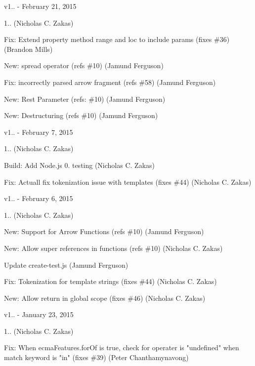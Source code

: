 v1.. -\/ February 21, 2015


\begin{DoxyItemize}
\item 1.. (Nicholas C. Zakas)
\item Fix\+: Extend property method range and loc to include params (fixes \#36) (Brandon Mills)
\item New\+: spread operator (refs \#10) (Jamund Ferguson)
\item Fix\+: incorrectly parsed arrow fragment (refs \#58) (Jamund Ferguson)
\item New\+: Rest Parameter (refs\+: \#10) (Jamund Ferguson)
\item New\+: Destructuring (refs \#10) (Jamund Ferguson)
\end{DoxyItemize}

v1.. -\/ February 7, 2015


\begin{DoxyItemize}
\item 1.. (Nicholas C. Zakas)
\item Build\+: Add Node.\+js 0. testing (Nicholas C. Zakas)
\item Fix\+: Actuall fix tokenization issue with templates (fixes \#44) (Nicholas C. Zakas)
\end{DoxyItemize}

v1.. -\/ February 6, 2015


\begin{DoxyItemize}
\item 1.. (Nicholas C. Zakas)
\item New\+: Support for Arrow Functions (refs \#10) (Jamund Ferguson)
\item New\+: Allow super references in functions (refs \#10) (Nicholas C. Zakas)
\item Update create-\/test.\+js (Jamund Ferguson)
\item Fix\+: Tokenization for template strings (fixes \#44) (Nicholas C. Zakas)
\item New\+: Allow return in global scope (fixes \#46) (Nicholas C. Zakas)
\end{DoxyItemize}

v1.. -\/ January 23, 2015


\begin{DoxyItemize}
\item 1.. (Nicholas C. Zakas)
\item Fix\+: When ecma\+Features.\+for\+Of is true, check for operater is "{}undefined"{} when match keyword is "{}in"{} (fixes \#39) (Peter Chanthamynavong)
\end{DoxyItemize}

